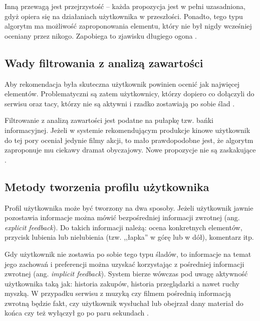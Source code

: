 \documentclass[twoside]{iisthesis}
\begin{document}
	 Inną przewagą jest przejrzystość -- każda propozycja jest w pełni uzasadniona, gdyż opiera się na działaniach użytkownika w przeszłości. Ponadto, tego typu algorytm ma możliwość zaproponowania elementu, który nie był nigdy wcześniej oceniany przez nikogo. Zapobiega to zjawisku długiego ogona \cite{id:ContentBasedRecommenderSystemsState}.
	 
	 \subsection{Wady filtrowania z analizą zawartości}
	 Aby rekomendacja była skuteczna użytkownik powinien ocenić jak najwięcej elementów. Problematyczni są zatem użytkownicy, którzy dopiero co dołączyli do serwisu oraz tacy, którzy nie są aktywni i rzadko zostawiają po sobie ślad \cite{id:MaleszkaMianowskaNguyenmethod}.
	 
	 Filtrowanie z analizą zawartości jest podatne na pułapkę tzw. bańki informacyjnej. Jeżeli w systemie rekomendującym produkcje kinowe użytkownik do tej pory oceniał jedynie filmy akcji, to mało prawdopodobne jest, że algorytm zaproponuje mu ciekawy dramat obyczajowy. Nowe propozycje nie są zaskakujące \cite{id:ContentBasedRecommenderSystemsState}.
	 	 
	 \subsection{Metody tworzenia profilu użytkownika}
	 \label{ss:metody_tworzenia_profilu_uzytkownika}
	 
	 Profil użytkownika może być tworzony na dwa sposoby. Jeżeli użytkownik jawnie pozostawia informacje można mówić bezpośredniej informacji zwrotnej (ang. \textit{explicit feedback}). Do takich informacji należą: ocena konkretnych elementów, przycisk lubienia lub nielubienia (tzw. ,,łapka'' w górę lub w dół), komentarz itp. 
	 
	 Gdy użytkownik nie zostawia po sobie tego typu śladów, to informacje na temat jego zachowań i preferencji można uzyskać korzystając z pośredniej informacji zwrotnej (ang. \textit{implicit feedback}). System bierze wówczas pod uwagę aktywność użytkownika taką jak: historia zakupów, historia przeglądarki a nawet ruchy myszką. W przypadku serwisu z muzyką czy filmem pośrednią informacją zwrotną będzie fakt, czy użytkownik wysłuchał lub obejrzał dany materiał do końca czy też wyłączył go po paru sekundach \cite{id:AdvancesInCollaborativeFiltering,id:ContentBasedRecommenderSystemsState}.
	 
\end{document}
